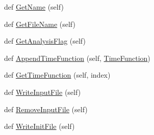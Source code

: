 \begin{DoxyCompactItemize}
\item 
def \hyperlink{classgebtaero_1_1_input_file_1_1_input_file_acae95b1a0b2631341592cf0abe4178c8}{Get\+Name} (self)
\item 
def \hyperlink{classgebtaero_1_1_input_file_1_1_input_file_a3fe8f05410f29d9c555adbee5dae9e16}{Get\+File\+Name} (self)
\item 
def \hyperlink{classgebtaero_1_1_input_file_1_1_input_file_a8d9a4bed8ff821455af85d5440329fe8}{Get\+Analysis\+Flag} (self)
\item 
def \hyperlink{classgebtaero_1_1_input_file_1_1_input_file_a3cf4d7178dc0471896e7c60f6c17e906}{Append\+Time\+Function} (self, \hyperlink{classgebtaero_1_1_time_function_1_1_time_function}{Time\+Function})
\item 
def \hyperlink{classgebtaero_1_1_input_file_1_1_input_file_a5d53bb9ae864d002dfbbee1231b91881}{Get\+Time\+Function} (self, index)
\item 
def \hyperlink{classgebtaero_1_1_input_file_1_1_input_file_aff90830e65ba0e25b330c595a94a7a82}{Write\+Input\+File} (self)
\item 
def \hyperlink{classgebtaero_1_1_input_file_1_1_input_file_a5c0e5660a7e8a816f2fe3b712480306a}{Remove\+Input\+File} (self)
\item 
def \hyperlink{classgebtaero_1_1_input_file_1_1_input_file_a0138cdf368f06be59a355955c737a3c3}{Write\+Init\+File} (self)
\end{DoxyCompactItemize}
